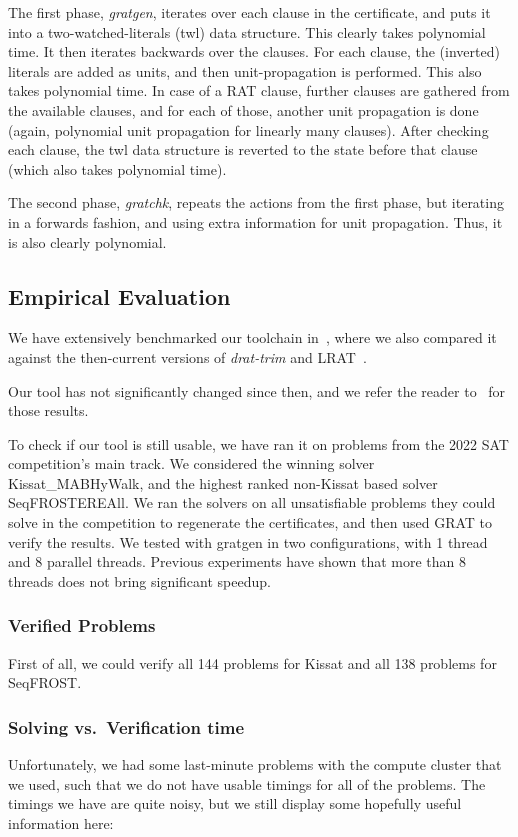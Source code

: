 \documentclass{llncs}     %
\begin{document}
The first phase, {\sl gratgen}, iterates over each clause in the certificate, and puts it into a two-watched-literals (twl) data structure. This clearly takes polynomial time. It then iterates backwards over the clauses.
For each clause, the (inverted) literals are added as units, and then unit-propagation is performed.
This also takes polynomial time. In case of a RAT clause, further clauses are gathered from the available clauses,
and for each of those, another unit propagation is done (again, polynomial unit propagation for linearly many clauses).
After checking each clause, the twl data structure is reverted to the state before that clause (which also takes polynomial time).

The second phase, {\sl gratchk}, repeats the actions from the first phase, but iterating in a forwards fashion, and using extra information for unit propagation. Thus, it is also clearly polynomial.


\subsection{Empirical Evaluation}
  We have extensively benchmarked our toolchain in~\cite{La20}, where we also compared it
  against the then-current versions of {\sl drat-trim} and LRAT~\cite{HHKW17}.

  Our tool has not significantly changed since then, and we refer the reader to~\cite{La20} for those results.

  To check if our tool is still usable, we have ran it on problems from the 2022 SAT competition's main track.
  We considered the winning solver Kissat\_MAB\-HyWalk, and the highest ranked non-Kissat based solver SeqFROST\-ERE\-All. We ran the solvers on all unsatisfiable problems they could solve in the competition to regenerate the certificates, and then used GRAT to verify the results. We tested with gratgen in two configurations, with 1 thread and 8 parallel threads. Previous experiments have shown that more than 8 threads does not bring significant speedup.

  \subsubsection{Verified Problems}
  First of all, we could verify all 144 problems for Kissat and all 138 problems for SeqFROST.

  \subsubsection{Solving vs.\ Verification time}
  Unfortunately, we had some last-minute problems with the compute cluster that we used, such that we do not have usable timings for all of the problems. The timings we have are quite noisy, but we still display some hopefully useful information here:
\end{document}

